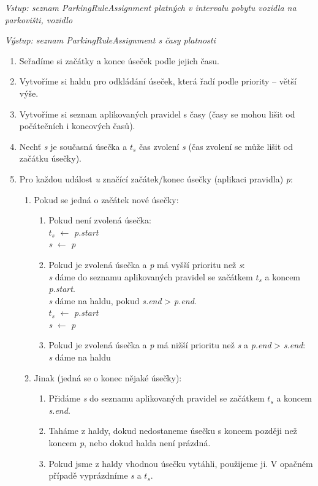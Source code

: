 \vspace{5mm}
\noindent
\textit{Vstup: seznam ParkingRuleAssignment platných v intervalu pobytu vozidla na parkovišti, vozidlo}

\noindent
\textit{Výstup: seznam ParkingRuleAssignment s časy platnosti}

\begin{enumerate}
  \setlength\itemsep{.05em}
  \item Seřadíme si začátky a konce úseček podle jejich času.
  \item Vytvoříme si haldu pro odkládání úseček, která řadí podle priority -- větší výše.
  \item Vytvoříme si seznam aplikovaných pravidel s časy (časy se mohou lišit od počátečních i koncových časů).
  \item Nechť \textit{s} je současná úsečka a \textit{$t_s$} čas zvolení \textit{s} (čas zvolení se může lišit od začátku úsečky).
  \item Pro každou událost \textit{u} značící začátek/konec úsečky (aplikaci pravidla) \textit{p}:
  \begin{enumerate}
    \item Pokud se jedná o začátek nové úsečky:
    \begin{enumerate}
      \item Pokud není zvolená úsečka:\\
            \textit{$t_s$} $\leftarrow$ \textit{p.start}\\
            \textit{s} $\leftarrow$ \textit{p}
      \item Pokud je zvolená úsečka a \textit{p} má vyšší prioritu než \textit{s}:\\
            \textit{s} dáme do seznamu aplikovaných pravidel se začátkem \textit{$t_s$} a koncem \textit{p.start}.\\
            \textit{s} dáme na haldu, pokud \textit{s.end} > \textit{p.end}.\\
            \textit{$t_s$} $\leftarrow$ \textit{p.start}\\
            \textit{s} $\leftarrow$ \textit{p}
      \item Pokud je zvolená úsečka a \textit{p} má nižší prioritu než \textit{s} a \textit{p.end} > \textit{s.end}:\\
            \textit{s} dáme na haldu
    \end{enumerate}
    \item Jinak (jedná se o konec nějaké úsečky):
    \begin{enumerate}
      \item Přidáme \textit{s} do seznamu aplikovaných pravidel se začátkem \textit{$t_s$} a koncem \textit{s.end}.
      \item Taháme z haldy, dokud nedostaneme úsečku s koncem později než koncem \textit{p}, nebo dokud halda není prázdná.
      \item Pokud jsme z haldy vhodnou úsečku vytáhli, použijeme ji. V opačném případě vyprázdníme \textit{s} a \textit{$t_s$}.
    \end{enumerate}
  \end{enumerate}
\end{enumerate}

